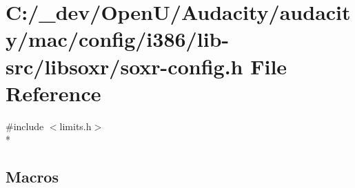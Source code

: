 \hypertarget{mac_2config_2i386_2lib-src_2libsoxr_2soxr-config_8h}{}\section{C\+:/\+\_\+dev/\+Open\+U/\+Audacity/audacity/mac/config/i386/lib-\/src/libsoxr/soxr-\/config.h File Reference}
\label{mac_2config_2i386_2lib-src_2libsoxr_2soxr-config_8h}
{\ttfamily \#include $<$limits.\+h$>$}\\*
\subsection*{Macros}
